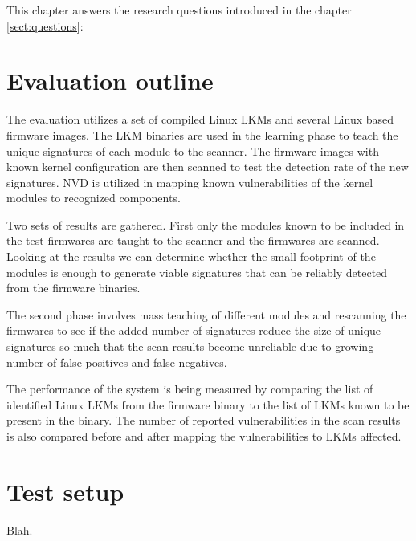 
This chapter answers the research questions introduced in the chapter \ref{sect:questions}:



\section{Evaluation outline}

The evaluation utilizes a set of compiled Linux LKMs and several Linux based firmware images. The
LKM binaries are used in the learning phase to teach the unique signatures of each module to the
scanner. The firmware images with known kernel configuration are then scanned to test the detection
rate of the new signatures. NVD is utilized in mapping known vulnerabilities of the kernel modules
to recognized components.

Two sets of results are gathered. First only the modules known to be included in the test
firmwares are taught to the scanner and the firmwares are scanned. Looking at the results we can
determine whether the small footprint of the modules is enough to generate viable signatures that
can be reliably detected from the firmware binaries.

The second phase involves mass teaching of different modules and rescanning the firmwares to see
if the added number of signatures reduce the size of unique signatures so much that the scan
results become unreliable due to growing number of false positives and false negatives.

The performance of the system is being measured by comparing the list of identified Linux LKMs from
the firmware binary to the list of LKMs known to be present in the binary. The number of reported
vulnerabilities in the scan results is also compared before and after mapping the vulnerabilities to
LKMs affected.

\section{Test setup}

Blah.
